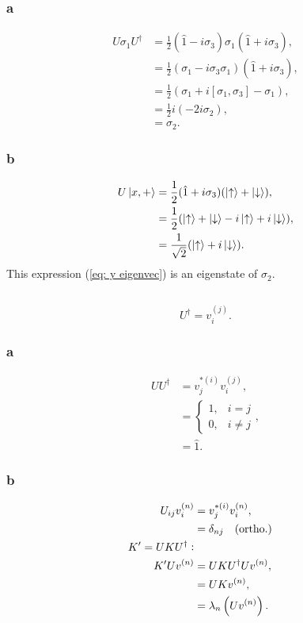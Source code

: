 \documentclass[a4paper,12pt,twoside]{article}
\begin{document}
\subsubsection*{a}
\begin{align}
	U\sigma_1U^\dagger &= \frac{1}{2}(\hat{1}-i\sigma_3)\sigma_1(\hat{1}+i\sigma_3),\\
	&= \frac{1}{2}(\sigma_1 - i\sigma_3\sigma_1)(\hat{1}+i\sigma_3),\\
	&= \frac{1}{2}(\sigma_1+i[\sigma_1,\sigma_3] - \sigma_1),\\
	&= \frac{1}{2} i (-2i\sigma_2),\\
	&= \sigma_2.
\end{align}
\subsubsection*{b}
\begin{align}
	U\ket{x,+} &= \frac{1}{2}(\hat{1}+i\sigma_3)(\ket{\uparrow}+\ket{\downarrow}),\\
	&= \frac{1}{2}(\ket{\uparrow}+\ket{\downarrow}-i\ket{\uparrow}+i\ket{\downarrow}),\\
	&= \frac{1}{\sqrt{2}}(\ket{\uparrow}+i\ket{\downarrow}).
	\label{eq: y eigenvec}
\end{align}
This expression (\ref{eq: y eigenvec}) is an eigenstate of $\sigma_2$.
\subsection{}%
\begin{equation}
	U^\dagger = v_i^{(j)}.
\end{equation}
\subsubsection*{a}
\begin{align}
	UU^\dagger &= v_j^{*(i)}v_i^{(j)},\\
	&= \left\{\begin{array}{lr}
		1, & i=j \\
		0, & i\neq j
	\end{array}\right.,\\
	&= \hat{1}.
\end{align}
\subsubsection*{b}
\begin{align}
	U_{ij} v_i^{(n)} &= v_j^{*(i)}v_i^{(n)},\\
	&= \delta_{nj}\qq{(ortho.)}\\
	K' = UKU^\dagger:&\\
	K'U v^{(n)} &= UKU^\dagger U v^{(n)},\\
	&= UK v^{(n)},\\
	&= \lambda_n \left(Uv^{(n)}\right).
\end{align}
\end{document}
